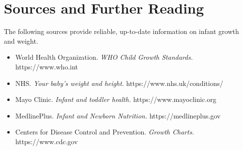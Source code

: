 \section*{Sources and Further Reading}
The following sources provide reliable, up-to-date information on infant growth and weight.
\begin{itemize}
    \item World Health Organization. \textit{WHO Child Growth Standards.} https://www.who.int
    \item NHS. \textit{Your baby's weight and height.} https://www.nhs.uk/conditions/
    \item Mayo Clinic. \textit{Infant and toddler health.} https://www.mayoclinic.org
    \item MedlinePlus. \textit{Infant and Newborn Nutrition.} https://medlineplus.gov
    \item Centers for Disease Control and Prevention. \textit{Growth Charts.} https://www.cdc.gov
\end{itemize}
